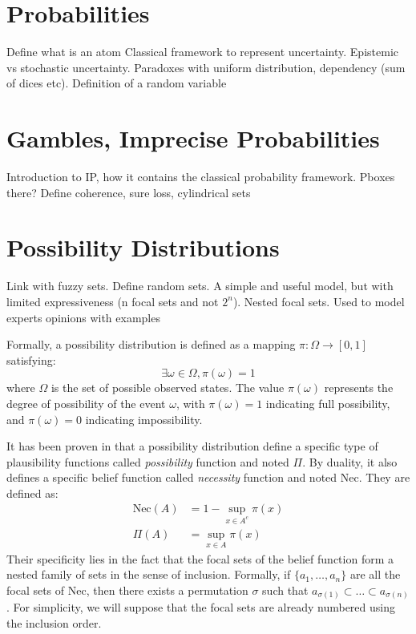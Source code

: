 \section{Probabilities}
Define what is an atom
Classical framework to represent uncertainty. Epistemic vs stochastic uncertainty. Paradoxes with uniform distribution, dependency (sum of dices etc). Definition of a random variable \etc
\section{Gambles, Imprecise Probabilities}
Introduction to IP, how it contains the classical probability framework. Pboxes there?
Define coherence, sure loss, cylindrical sets
\section{Possibility Distributions}\label{sec:possibilities}
Link with fuzzy sets. Define random sets. A simple and useful model, but with limited expressiveness (n focal sets and not $2^n$). Nested focal sets. Used to model experts opinions with examples \cite{baudrit_joint_2007}

Formally, a possibility distribution is defined as a mapping $\pi: \Omega \rightarrow [0,1]$ satisfying:
\begin{equation}
	\exists \omega \in \Omega, \pi(\omega) = 1 \label{eq:possibility}
\end{equation}
where $\Omega$ is the set of possible observed states. The value $\pi(\omega)$ represents the degree of possibility of the event $\omega$, with $\pi(\omega) = 1$ indicating full possibility, and $\pi(\omega) = 0$ indicating impossibility.

It has been proven in \cite{dubois_when_1992} that a possibility distribution define a specific type of plausibility functions called \textit{possibility} function and noted \(\Pi\). By duality, it also defines a specific belief function called \textit{necessity} function and noted \(\mathrm{Nec}\). They are defined as:
\begin{align}
    \mathrm{Nec}(A)&=1-\sup_{x\in A^c}\pi(x)\label{eq:bel_pl}\\
    \Pi(A) &= \sup_{x\in A}\pi(x)
\end{align}
Their specificity lies in the fact that the focal sets of the belief function form a nested family of sets in the sense of inclusion. Formally, if \( \{a_1,\dots,a_n\} \) are all the focal sets of \(\mathrm{Nec}\), then there exists a permutation $\sigma$ such that \( a_{\sigma(1)}\subset\dots\subset a_{\sigma(n)}\). For simplicity, we will suppose that the focal sets are already numbered using the inclusion order.

